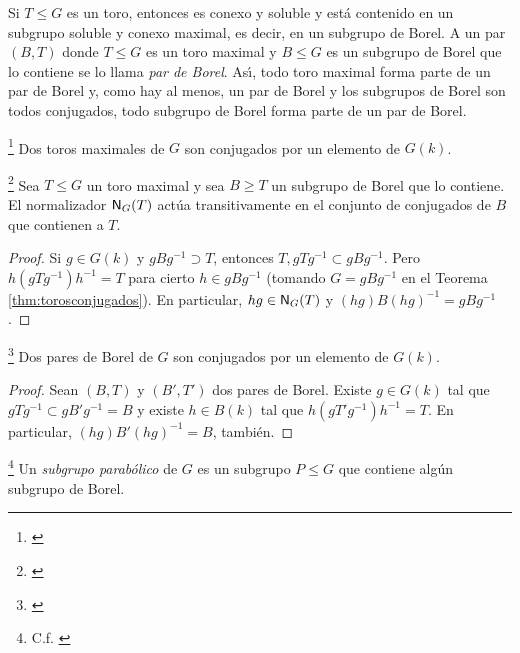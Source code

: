 Si $T\leq G$ es un toro, entonces es conexo y soluble y est\'{a} contenido en
un subgrupo soluble y conexo maximal, es decir, en un subgrupo de Borel. A un
par $(B,T)$ donde $T\leq G$ es un toro maximal y $B\leq G$ es un subgrupo de
Borel que lo contiene se lo llama \emph{par de Borel}. As\'{\i}, todo toro
maximal forma parte de un par de Borel y, como hay al menos, un par de Borel y
los subgrupos de Borel son todos conjugados, todo subgrupo de Borel forma parte
de un par de Borel.

\begin{teoTorosConjugados}\label{thm:torosconjugados}
	\footnote{
		\cite[Theorem~17.10]{MilneAlgebraicGroups}
	}
	Dos toros maximales de $G$ son conjugados por un elemento de $G(k)$.
\end{teoTorosConjugados}

\begin{coroNormalizadorDelToro}\label{coro:normalizadordeltoro}
	\footnote{
		\cite[Corollary~17.11]{MilneAlgebraicGroups}
	}
	Sea $T\leq G$ un toro maximal y sea $B\geq T$ un subgrupo de Borel que
	lo contiene. El normalizador $\normaliza[G](T)$ act\'{u}a
	transitivamente en el conjunto de conjugados de $B$ que contienen a
	$T$.
\end{coroNormalizadorDelToro}

\begin{proof}
	Si $g\in G(k)$ y $gBg^{-1}\supset T$, entonces
	$T,gTg^{-1}\subset gBg^{-1}$. Pero $h(gTg^{-1})h^{-1}=T$ para cierto
	$h\in gBg^{-1}$ (tomando $G=gBg^{-1}$ en el Teorema~%
	\ref{thm:torosconjugados}). En particular, $hg\in\normaliza[G](T)$ y
	$(hg)B(hg)^{-1}=gBg^{-1}$.
\end{proof}

\begin{teoParesConjugados}\label{thm:paresconjugados}
	\footnote{
		\cite[Proposition~17.13]{MilneAlgebraicGroups}
	}
	Dos pares de Borel de $G$ son conjugados por un elemento de $G(k)$.
\end{teoParesConjugados}

\begin{proof}
	Sean $(B,T)$ y $(B',T')$ dos pares de Borel. Existe $g\in G(k)$ tal que
	$gTg^{-1}\subset gB'g^{-1}=B$ y existe $h\in B(k)$ tal que
	$h(gT'g^{-1})h^{-1}=T$. En particular, $(hg)B'(hg)^{-1}=B$,
	tambi\'{e}n.
\end{proof}

\begin{defParabolico}\label{def:parabolico}
	\footnote{
		C.f. \cite[Theorem~17.16]{MilneAlgebraicGroups}
	}
	Un \emph{subgrupo parab\'{o}lico} de $G$ es un subgrupo $P\leq G$ que
	contiene alg\'{u}n subgrupo de Borel.
\end{defParabolico}

